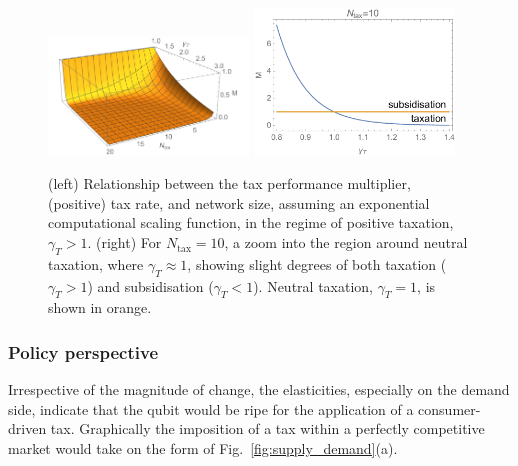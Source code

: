 \begin{figure}[!htbp]
\includegraphics[clip=true, width=0.475\textwidth]{tax_exp}
\includegraphics[clip=true, width=0.475\textwidth]{tax_subsidy}
\captionspacefig \caption{(left) Relationship between the tax performance multiplier, (positive) tax rate, and network size, assuming an exponential computational scaling function, in the regime of positive taxation, \mbox{$\gamma_T>1$}. (right) For \mbox{$N_\mathrm{tax}=10$}, a zoom into the region around neutral taxation, where \mbox{$\gamma_T\approx 1$}, showing slight degrees of both taxation (\mbox{$\gamma_T>1$}) and subsidisation (\mbox{$\gamma_T<1$}). Neutral taxation, \mbox{$\gamma_T=1$}, is shown in orange.}\label{fig:tax_exp}
\end{figure}
\fi

\subsubsection{Policy perspective}\label{sec:policy}

Irrespective of the magnitude of change, the elasticities, especially on the demand side, indicate that the qubit would be ripe for the application of a consumer-driven tax. Graphically the imposition of a tax within a perfectly competitive market would take on the form of Fig.~\ref{fig:supply_demand}(a).

